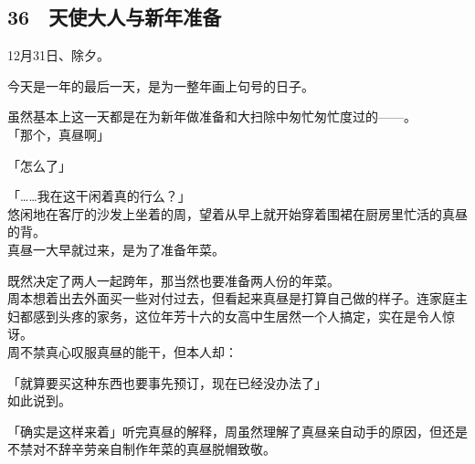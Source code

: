 \subsection{36　天使大人与新年准备}

12月31日、除夕。

今天是一年的最后一天，是为一整年画上句号的日子。

虽然基本上这一天都是在为新年做准备和大扫除中匆忙匆忙度过的——。\\

「那个，真昼啊」

「怎么了」

「……我在这干闲着真的行么？」\\

悠闲地在客厅的沙发上坐着的周，望着从早上就开始穿着围裙在厨房里忙活的真昼的背。\\

真昼一大早就过来，是为了准备年菜。

既然决定了两人一起跨年，那当然也要准备两人份的年菜。\\

周本想着出去外面买一些对付过去，但看起来真昼是打算自己做的样子。连家庭主妇都感到头疼的家务，这位年芳十六的女高中生居然一个人搞定，实在是令人惊讶。\\

周不禁真心叹服真昼的能干，但本人却：

「就算要买这种东西也要事先预订，现在已经没办法了」\\

如此说到。

「确实是这样来着」听完真昼的解释，周虽然理解了真昼亲自动手的原因，但还是不禁对不辞辛劳亲自制作年菜的真昼脱帽致敬。\\

